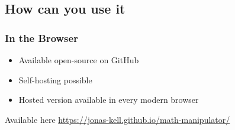     \subsection{How can you use it}
        \begin{frame}
            \frametitle{In the Browser}

            \begin{itemize}
                \item Available open-source on GitHub
                \item Self-hosting possible
                \item Hosted version available in every modern browser
            \end{itemize}

            \vspace{1em}

            \begin{block}{Available here}
                \href{https://jonas-kell.github.io/math-manipulator/}{https://jonas-kell.github.io/math-manipulator/}
            \end{block}

            \onslide %
        \end{frame}
    
